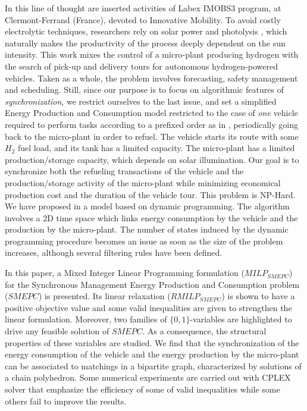 \documentclass[11pt]{article}
\theoremstyle{plain}%
\theoremstyle{definition} \newtheorem{lem}{Lemma}[section]
\theoremstyle{definition} \newtheorem{claim}{Claim}[lem]
\theoremstyle{definition} \newtheorem{theorem}{Theorem}[section]
\theoremstyle{definition} \newtheorem{exo}{Exercice n$^\circ$}
\theoremstyle{definition} \newtheorem{quest}{}[exo]
\theoremstyle{definition} \newtheorem{sousquest}{}[quest]
\theoremstyle{remark}
\theoremstyle{definition}
\begin{document}
In this line of thought are inserted  activities of Labex IMOBS3 program, at Clermont-Ferrand (France),
 devoted to Innovative Mobility. To avoid costly electrolytic techniques, researchers rely on 
solar power and photolysis \cite{Grim,Lich}, which naturally  makes
the productivity of the process deeply dependent on the sun intensity.
This work mixes the control of a micro-plant producing hydrogen with the search of pick-up and delivery tours
for  autonomous
hydrogen-powered vehicles. %
Taken as a whole, the problem involves forecasting, safety management and scheduling. Still, since our purpose is to focus on algorithmic features of
\emph{synchronization}, we restrict ourselves to the last issue, and set a simplified Energy Production and Consumption model restricted to the case of 
\emph{one} vehicle required to perform tasks according to a prefixed order  as in \cite{Koc}, periodically going back to the micro-plant in order to refuel. The vehicle starts
its route with some $H_2$ fuel load, and its tank has a limited capacity.
The micro-plant has a limited
production/storage capacity, which depends on solar illumination. Our goal is to synchronize both 
the refueling transactions of the vehicle and the production/storage activity of the
micro-plant while minimizing economical production  cost and the duration of the vehicle tour. This problem is NP-Hard. 
We have proposed in \cite{Bend} a model based on dynamic programming. The 
algorithm  involves a 2D time space which links energy consumption by the vehicle and the production
by the micro-plant. The number of states induced by the dynamic programming procedure becomes an issue as soon
as the size of the problem increases, although  several filtering rules  have been defined. 

In this paper,  a Mixed Integer Linear Programming formulation ($MILP_{SMEPC}$) for the Synchronous Management Energy Production and Consumption problem ($SMEPC$)
is presented. Its linear relaxation  ($RMILP_{SMEPC}$) is shown to have a positive objective value and 
 some valid inequalities are given to strengthen the  linear formulation. 
Moreover,  two families of $\{0,1\}$-variables are highlighted to drive any feasible solution  of $ SMEPC$.
As a consequence, the structural properties of these variables are studied. 
We find that the synchronization of the energy consumption of the vehicle and the energy production by the micro-plant can be associated to 
 matchings in a bipartite graph, characterized by  solutions of a chain polyhedron.
Some numerical experiments are carried out with CPLEX solver that emphasize the efficiency of some of valid inequalities while some others fail to improve the results. 
\end{document}
